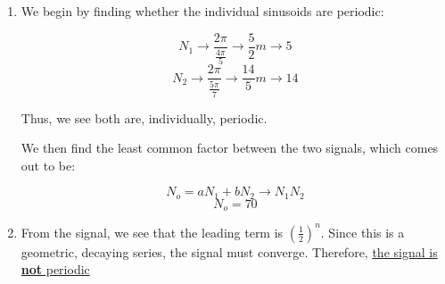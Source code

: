 \begin{enumerate}[label=\textbf{\Alph*}.]
\begin{enumerate}[label=\textbf{\Roman*}.]
      \item We begin by finding whether the individual sinusoids are periodic:

        $$N_1\to \frac{2\pi}{\frac{4\pi}{5}}\to \frac{5}{2}m\to 5$$
        $$N_2\to \frac{2\pi}{\frac{5\pi}{7}}\to \frac{14}{5}m\to 14$$

        Thus, we see both are, individually, periodic.

        We then find the least common factor between the two signals, which comes out to be:

        $$N_o=aN_1+bN_2\to N_1N_2$$
        $$\boxed{N_o=70}$$

      \item From the signal, we see that the leading term is $\left( \frac{1}{2} \right)^n$. Since this is a geometric, decaying series, the signal must converge. Therefore, \underline{the signal is \textbf{not} periodic}

    \end{enumerate}

\end{enumerate}



